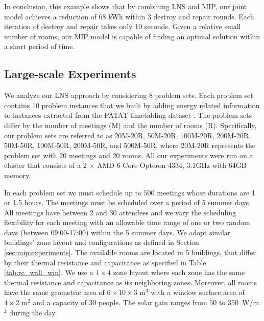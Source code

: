 In conclusion, this example shows that by combining LNS and MIP, our joint model achieves a reduction of 68 kWh within 3 destroy and repair rounds. Each iteration of destroy and repair takes only 10 seconds.  Given a relative small number of rooms, our MIP model is capable of finding an optimal solution within a short period of time. 


\subsection{Large-scale Experiments}

We analyze our LNS approach by considering 8 problem sets. Each problem set contains 10 problem instances that we built by adding energy related information to instances extracted from the PATAT timetabling dataset \citep{patat02}. The problem sets differ by the number of meetings (M) and the number of rooms (R). Specifically, our problem sets are referred to as 20M-20R, 50M-20R, 100M-20R, 200M-20R, 50M-50R, 100M-50R, 200M-50R, and 500M-50R, where 20M-20R represents the problem set with 20 meetings and 20 rooms. All our experiments were run on a cluster that consists of a 2 $\times$ AMD 6-Core Opteron 4334, 3.1GHz with 64GB memory.

In each problem set we must schedule up to 500 meetings whose durations are 1 or 1.5 hours. The meetings must be scheduled over a period of 5 summer days. All meetings have between 2 and 30 attendees and we vary the scheduling flexibility for each meeting with an allowable time range of one or two random days (between 09:00-17:00) within the 5 summer days. 
We adopt similar buildings' zone layout and configurations as defined in Section \ref{sec:mip:experiments}. 
The available rooms are located in 5 buildings, that differ by their thermal resistance and capacitance as specified in Table \ref{tab:rc_wall_win}. We use a $1\times4$ zone layout where each zone has the same thermal resistance and capacitance as its neighboring zones. Moreover, all rooms have the same geometric area of $6\times10\times3$ m$^3$ with a window surface area of $4\times2$ m$^2$ and a capacity of 30 people. The solar gain ranges from $50$ to $350$~W/m$^2$ during the day. 

